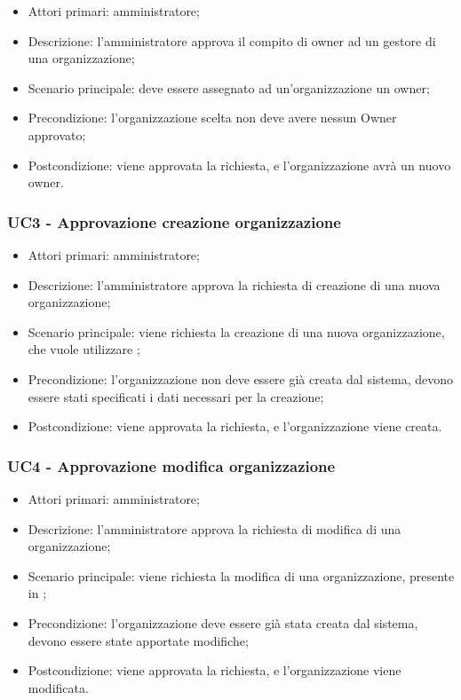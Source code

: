 \begin{itemize}
\item Attori primari: amministratore;
\item Descrizione: l'amministratore approva il compito di owner ad un gestore di una organizzazione;
\item Scenario principale: deve essere assegnato ad un'organizzazione un owner;
\item Precondizione: l'organizzazione scelta non deve avere nessun Owner approvato;
\item Postcondizione: viene approvata la richiesta, e l'organizzazione avrà un nuovo owner.

\end{itemize}

\subsubsection{UC3 - Approvazione creazione organizzazione}

\begin{itemize}
\item Attori primari: amministratore;
\item Descrizione: l'amministratore approva la richiesta di creazione di una nuova organizzazione;
\item Scenario principale: viene richiesta la creazione di una nuova organizzazione, che vuole utilizzare ;
\item Precondizione: l'organizzazione non deve essere già creata dal sistema, devono essere stati specificati i dati necessari per la creazione;
\item Postcondizione: viene approvata la richiesta, e l'organizzazione viene creata.

\end{itemize}

\subsubsection{UC4 - Approvazione modifica organizzazione}

\begin{itemize}
\item Attori primari: amministratore;
\item Descrizione: l'amministratore approva la richiesta di modifica di una organizzazione;
\item Scenario principale: viene richiesta la modifica di una organizzazione, presente in ;
\item Precondizione: l'organizzazione deve essere già stata creata dal sistema, devono essere state apportate modifiche;
\item Postcondizione: viene approvata la richiesta, e l'organizzazione viene modificata.

\end{itemize}

